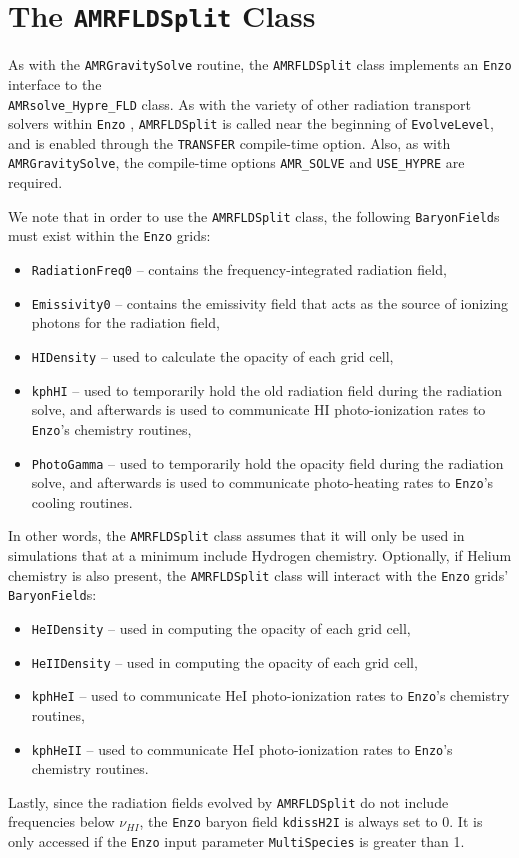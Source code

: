 \documentclass[letterpaper,10pt]{article}
\renewcommand{\(}{\left(}
\renewcommand{\)}{\right)}
\newcommand{\enzo}{{\tt Enzo} }
\begin{document}
\section{The {\tt AMRFLDSplit} Class}
\label{sec:AMRFLDSplit}

As with the {\tt AMRGravitySolve} routine, the {\tt AMRFLDSplit}
class implements an \enzo interface to the \\
{\tt AMRsolve\_Hypre\_FLD} class.  As with the variety of other
radiation transport solvers within \enzo, {\tt AMRFLDSplit} is called
near the beginning of {\tt EvolveLevel}, and is enabled through the
{\tt TRANSFER} compile-time option.  Also, as with 
{\tt AMRGravitySolve}, the compile-time options {\tt AMR\_SOLVE} and
{\tt USE\_HYPRE} are required.

We note that in order to use the {\tt AMRFLDSplit} class, the
following {\tt BaryonField}s must exist within the \enzo grids:
\begin{itemize}
\item {\tt RadiationFreq0} -- contains the
  frequency-integrated radiation field,
\item {\tt Emissivity0} -- contains the emissivity field that
  acts as the source of ionizing photons for the radiation field,
\item {\tt HIDensity} -- used to calculate the opacity of
  each grid cell,
\item {\tt kphHI} -- used to temporarily hold the old radiation field
  during the radiation solve, and afterwards is used to communicate HI
  photo-ionization rates to {\tt Enzo}'s chemistry routines,
\item {\tt PhotoGamma} -- used to temporarily hold the opacity field
  during the radiation solve, and afterwards is used to communicate
  photo-heating rates to {\tt Enzo}'s cooling routines.
\end{itemize}
In other words, the {\tt AMRFLDSplit} class assumes that it will only
be used in simulations that at a minimum include Hydrogen chemistry.
Optionally, if Helium chemistry is also present, the {\tt AMRFLDSplit}
class will interact with the \enzo grids' {\tt BaryonField}s:
\begin{itemize}
\item {\tt HeIDensity} -- used in computing the opacity of each grid cell,
\item {\tt HeIIDensity} -- used in computing the opacity of each grid cell,
\item {\tt kphHeI} -- used to communicate HeI photo-ionization rates to
  {\tt Enzo}'s chemistry routines,
\item {\tt kphHeII} -- used to communicate HeI photo-ionization rates to
  {\tt Enzo}'s chemistry routines.
\end{itemize}
Lastly, since the radiation fields evolved by {\tt AMRFLDSplit} do not
include frequencies below $\nu_{HI}$, the \enzo baryon field 
{\tt kdissH2I} is always set to 0.  It is only accessed if the \enzo
input parameter {\tt MultiSpecies} is greater than 1.
\end{document}
